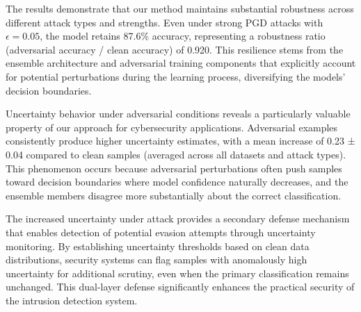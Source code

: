 \documentclass[journal]{IEEEtran}
\begin{document}
The results demonstrate that our method maintains substantial robustness across different attack types and strengths. Even under strong PGD attacks with $\epsilon = 0.05$, the model retains 87.6\% accuracy, representing a robustness ratio (adversarial accuracy / clean accuracy) of 0.920. This resilience stems from the ensemble architecture and adversarial training components that explicitly account for potential perturbations during the learning process, diversifying the models' decision boundaries.

Uncertainty behavior under adversarial conditions reveals a particularly valuable property of our approach for cybersecurity applications. Adversarial examples consistently produce higher uncertainty estimates, with a mean increase of 0.23 ± 0.04 compared to clean samples (averaged across all datasets and attack types). This phenomenon occurs because adversarial perturbations often push samples toward decision boundaries where model confidence naturally decreases, and the ensemble members disagree more substantially about the correct classification.

The increased uncertainty under attack provides a secondary defense mechanism that enables detection of potential evasion attempts through uncertainty monitoring. By establishing uncertainty thresholds based on clean data distributions, security systems can flag samples with anomalously high uncertainty for additional scrutiny, even when the primary classification remains unchanged. This dual-layer defense significantly enhances the practical security of the intrusion detection system.
\end{document}
